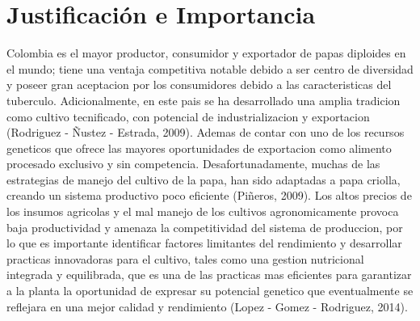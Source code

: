 \section{Justificaci\'on e Importancia}

Colombia es el mayor productor, consumidor y exportador de papas diploides en el mundo; tiene una ventaja competitiva notable debido a ser centro de diversidad y poseer gran aceptacion por los consumidores debido a las caracteristicas del tuberculo. Adicionalmente, en este pais se ha desarrollado una amplia tradicion como cultivo tecnificado, con potencial de industrializacion y exportacion (Rodriguez - Ñustez - Estrada, 2009). Ademas de contar con uno de los recursos geneticos que ofrece las mayores oportunidades de exportacion como alimento procesado exclusivo y sin competencia. Desafortunadamente, muchas de las estrategias de manejo del cultivo de la papa, han sido adaptadas a papa criolla, creando un sistema productivo poco eficiente (Piñeros, 2009). Los altos precios de los insumos agricolas y el mal manejo de los cultivos agronomicamente provoca  baja productividad y amenaza la competitividad del sistema de produccion, por lo que es importante identificar factores limitantes del rendimiento y desarrollar practicas innovadoras para el cultivo, tales como una gestion nutricional integrada y equilibrada, que es una de las practicas mas eficientes para garantizar a la planta la oportunidad de expresar su potencial genetico que eventualmente se reflejara en una mejor calidad y rendimiento (Lopez - Gomez - Rodriguez, 2014).\\
 
